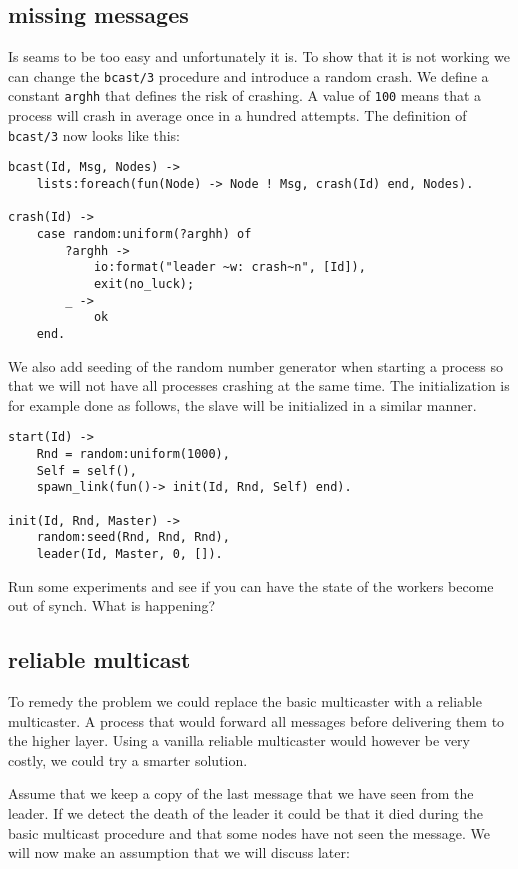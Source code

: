 \documentclass[a4paper,11pt]{article}
\begin{document}
\subsection{missing messages}

Is seams to be too easy and unfortunately it is. To show that it is
not working we can change the {\tt bcast/3} procedure and introduce a
random crash. We define a constant {\tt arghh} that defines the risk
of crashing. A value of {\tt 100} means that a process will crash in
average once in a hundred attempts. The definition of {\tt bcast/3}
now looks like this:

\begin{verbatim}
bcast(Id, Msg, Nodes) ->
    lists:foreach(fun(Node) -> Node ! Msg, crash(Id) end, Nodes).

crash(Id) ->
    case random:uniform(?arghh) of
        ?arghh ->
            io:format("leader ~w: crash~n", [Id]),
            exit(no_luck);
        _ ->
            ok
    end.
\end{verbatim}

We also add seeding of the random number generator when starting a
process so that we will not have all processes crashing at the same
time. The initialization is for example done as follows, the slave
will be initialized in a similar manner. 

\begin{verbatim}
start(Id) ->
    Rnd = random:uniform(1000),
    Self = self(),
    spawn_link(fun()-> init(Id, Rnd, Self) end).

init(Id, Rnd, Master) ->
    random:seed(Rnd, Rnd, Rnd),
    leader(Id, Master, 0, []).
\end{verbatim}

Run some experiments and see if you can have the state of the workers
become out of synch. What is happening?

\subsection{reliable multicast}

To remedy the problem we could replace the basic multicaster with a
reliable multicaster. A process that would forward all messages before
delivering them to the higher layer. Using a vanilla reliable
multicaster would however be very costly, we could try a smarter
solution.

Assume that we keep a copy of the last message that we have seen from
the leader. If we detect the death of the leader it could be that it
died during the basic multicast procedure and that some nodes have not
seen the message. We will now make an assumption that we will discuss later:
\end{document}
